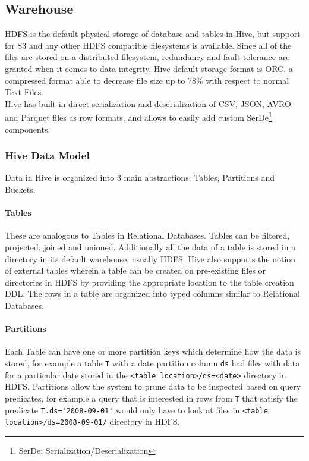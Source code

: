 \subsection{Warehouse}
HDFS is the default physical storage of database and tables in Hive, but support for S3 and any other HDFS compatible filesystems is available. Since all of the files are stored on a distributed filesystem, redundancy and fault tolerance are granted when it comes to data integrity. Hive default storage format is ORC, a compressed format able to decrease file size up to 78\% with respect to normal Text Files.\\
Hive has built-in direct serialization and deserialization of CSV, JSON, AVRO and Parquet files as row formats, and allows to easily add custom SerDe\footnote{SerDe: Serialization/Deserialization} components.

\subsubsection{Hive Data Model}

Data in Hive is organized into 3 main abstractions: Tables, Partitions and Buckets.

\paragraph{Tables} These are analogous to Tables in Relational Databases. Tables can be filtered, projected, joined and unioned. Additionally all the data of a table is stored in a directory in its default warehouse, usually HDFS. Hive also supports the notion of external tables wherein a table can be created on pre-existing files or directories in HDFS by providing the appropriate location to the table creation DDL. The rows in a table are organized into typed columns similar to Relational Databases.
\paragraph{Partitions} Each Table can have one or more partition keys which determine how the data is stored, for example a table \verb|T| with a date partition column  \verb|ds| had files with data for a particular date stored in the  \verb|<table location>/ds=<date>| directory in HDFS. Partitions allow the system to prune data to be inspected based on query predicates, for example a query that is interested in rows from \verb|T| that satisfy the predicate \verb|T.ds='2008-09-01'| would only have to look at files in \verb|<table location>/ds=2008-09-01/| directory in HDFS.
